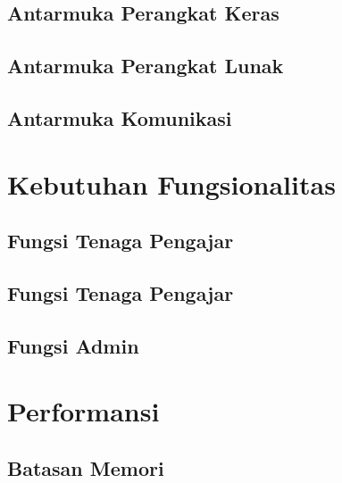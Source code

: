 \documentclass{scrreprt}
\begin{document}
	\blindtext[1]
	
	\subsection{Antarmuka Perangkat Keras}
	
	\blindtext[1]
	
	\subsection{Antarmuka Perangkat Lunak}
	
	\blindtext[1]
	
	\subsection{Antarmuka Komunikasi}
	
	\blindtext[1]
	
	



\section{Kebutuhan Fungsionalitas}

	\subsection{Fungsi Tenaga Pengajar}
	
	\blindtext[1]
	
	\subsection{Fungsi Tenaga Pengajar}
	
	\blindtext[1]
	
	\subsection{Fungsi Admin}
	
	\blindtext[1]
	
	
\section{Performansi}
\blindtext[1]

	\subsection{Batasan Memori}
	\blindtext[1]
	
\end{document}
